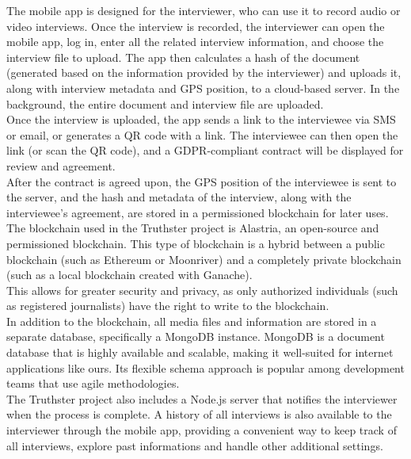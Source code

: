\documentclass[target=mst,aauheader=]{thud}
\begin{document}
The mobile app is designed for the interviewer, who can use it to record audio or video interviews. Once the interview is recorded, the interviewer can open the mobile app, log in, enter all the related interview information, and choose the interview file to upload. The app then calculates a hash of the document (generated based on the information provided by the interviewer) and uploads it, along with interview metadata and GPS position, to a cloud-based server. In the background, the entire document and interview file are uploaded.\\

Once the interview is uploaded, the app sends a link to the interviewee via SMS or email, or generates a QR code with a link. The interviewee can then open the link (or scan the QR code), and a GDPR-compliant contract will be displayed for review and agreement.\\
After the contract is agreed upon, the GPS position of the interviewee is sent to the server, and the hash and metadata of the interview, along with the interviewee's agreement, are stored in a permissioned blockchain for later uses.\\

The blockchain used in the Truthster project is Alastria, an open-source and permissioned blockchain. This type of blockchain is a hybrid between a public blockchain (such as Ethereum or Moonriver) and a completely private blockchain (such as a local blockchain created with Ganache).\\
This allows for greater security and privacy, as only authorized individuals (such as registered journalists) have the right to write to the blockchain.\\

In addition to the blockchain, all media files and information are stored in a separate database, specifically a MongoDB instance. MongoDB is a document database that is highly available and scalable, making it well-suited for internet applications like ours. Its flexible schema approach is popular among development teams that use agile methodologies.\\

The Truthster project also includes a Node.js server that notifies the interviewer when the process is complete. A history of all interviews is also available to the interviewer through the mobile app, providing a convenient way to keep track of all interviews, explore past informations and handle other additional settings.\\
\end{document}
